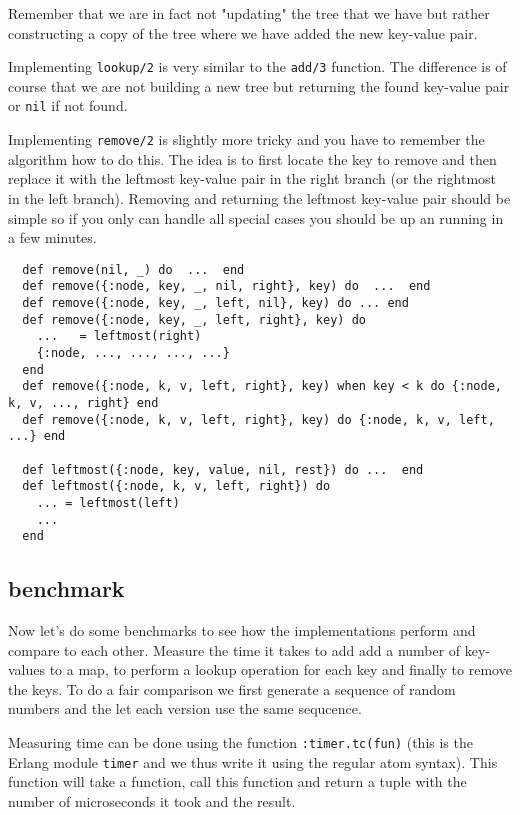 \documentclass[a4paper,11pt]{article}
\begin{document}
Remember that we are in fact not "updating" the tree that we have but
rather constructing a copy of the tree where we have added the new
key-value pair.

Implementing {\tt lookup/2} is very similar to the {\tt add/3}
function. The difference is of course that we are not building a new
tree but returning the found key-value pair or {\tt nil} if not found.

Implementing {\tt remove/2} is slightly more tricky and you have to
remember the algorithm how to do this. The idea is to first locate the
key to remove and then replace it with the leftmost key-value pair in
the right branch (or the rightmost in the left branch). Removing and
returning the leftmost key-value pair should be simple so if you only
can handle all special cases you should be up an running in a few minutes.

\begin{verbatim}
  def remove(nil, _) do  ...  end
  def remove({:node, key, _, nil, right}, key) do  ...  end
  def remove({:node, key, _, left, nil}, key) do ... end    
  def remove({:node, key, _, left, right}, key) do 
    ...   = leftmost(right)
    {:node, ..., ..., ..., ...}
  end
  def remove({:node, k, v, left, right}, key) when key < k do {:node, k, v, ..., right} end
  def remove({:node, k, v, left, right}, key) do {:node, k, v, left, ...} end

  def leftmost({:node, key, value, nil, rest}) do ...  end
  def leftmost({:node, k, v, left, right}) do
    ... = leftmost(left)
    ...
  end
\end{verbatim}


\subsection*{benchmark}

Now let's do some benchmarks to see how the implementations perform
and compare to each other. Measure the time it takes to add add a
number of key-values to a map, to perform a lookup operation for each
key and finally to remove the keys. To do a fair comparison we first
generate a sequence of random numbers and the let each version use the
same sequcence.

Measuring time can be done using the function {\tt :timer.tc(fun)}
(this is the Erlang module {\tt timer} and we thus write it using the
regular atom syntax). This function will take a function, call this
function and return a tuple with the number of microseconds it took and
the result.
\end{document}
